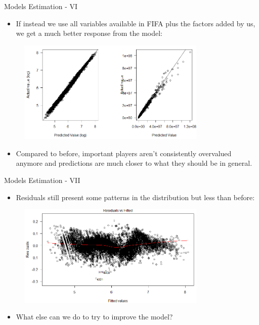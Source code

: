 \documentclass[aspectratio=169,xcolor=dvipsnames]{beamer}
\begin{document}
\begin{frame}{Models Estimation - VI}
\begin{itemize}
\item If instead we use all variables available in FIFA plus the factors added by us, we get a much better response from the model:
\end{itemize}

\begin{figure}[H] 
\begin{center}
  \includegraphics[width=9cm]{predictions_log_2.png}
  \end{center}
\end{figure}

\begin{itemize}
\item Compared to before, important players aren't consistently overvalued anymore and predictions are much closer to what they should be in general.
\end{itemize}
\end{frame}

\begin{frame}{Models Estimation - VII}
\begin{itemize}
\item Residuals still present some patterns in the distribution but less than before:
\end{itemize}

\begin{figure}[H] 
\begin{center}
  \includegraphics[width=9cm]{residuals_log_model2.png}
\end{center}
\end{figure}
\begin{itemize}
\item What else can we do to try to improve the model?
\end{itemize}
\end{frame}
\end{document}
